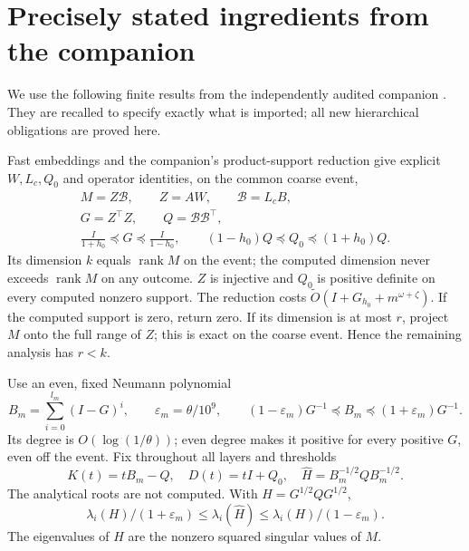 \documentclass[11pt]{article}
\newcommand{\rank}{\operatorname{rank}}
\newcommand{\tO}{\widetilde O}
\begin{document}
\section{Precisely stated ingredients from the companion}
We use the following finite results from the independently audited
companion \cite{companion}. They are recalled to specify exactly what
is imported; all new hierarchical obligations are proved here.

Fast embeddings \cite{cnw} and the companion's product-support reduction
give explicit \(W,L_c,Q_0\) and operator identities, on the common
coarse event,
\begin{equation}\label{eq:support}
 \begin{gathered}
 M=Z\mathcal B,\qquad Z=AW,\qquad\mathcal B=L_cB,\\
 G=Z^\top Z,\qquad Q=\mathcal B\mathcal B^\top,\\
 \frac I{1+h_0}\preceq G\preceq\frac I{1-h_0},\qquad
 (1-h_0)Q\preceq Q_0\preceq(1+h_0)Q.
 \end{gathered}
\end{equation}
Its dimension \(k\) equals \(\rank M\) on the event; the computed
dimension never exceeds \(\rank M\) on any outcome. \(Z\) is injective
and \(Q_0\) is positive definite on every computed nonzero support.
The reduction costs \(\tO(I+G_{h_0}+m^{\omega+\zeta})\).
If the computed support is zero, return zero. If its dimension is at most
\(r\), project \(M\) onto the full range of \(Z\); this is exact on
the coarse event. Hence the remaining analysis has \(r<k\).

Use an even, fixed Neumann polynomial
\[
 B_m=\sum_{i=0}^{l_m}(I-G)^i,\qquad
 \varepsilon_m=\theta/10^9,
 \qquad(1-\varepsilon_m)G^{-1}\preceq B_m
                   \preceq(1+\varepsilon_m)G^{-1}.
\]
Its degree is \(O(\log(1/\theta))\); even degree makes it positive
for every positive \(G\), even off the event. Fix throughout all layers
and thresholds
\begin{equation}\label{eq:truepencil}
 K(t)=tB_m-Q,\quad D(t)=tI+Q_0,\quad
 \widehat H=B_m^{-1/2}QB_m^{-1/2}.
\end{equation}
The analytical roots are not computed. With \(H=G^{1/2}QG^{1/2}\),
\begin{equation}\label{eq:masscompare}
 \lambda_i(H)/(1+\varepsilon_m)
 \leq\lambda_i(\widehat H)
 \leq\lambda_i(H)/(1-\varepsilon_m).
\end{equation}
The eigenvalues of \(H\) are the nonzero squared singular values of \(M\).
\end{document}
